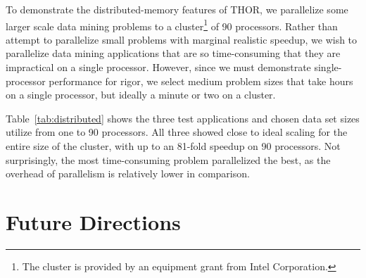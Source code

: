 \documentclass[twoside,leqno,twocolumn]{article}
\newcommand{\fig}[1]{Figure~\ref{fig:#1}}
\newcommand{\tab}[1]{Table~\ref{tab:#1}}
\begin{document}
To demonstrate the distributed-memory features of THOR, we parallelize some larger scale data mining problems to a cluster\footnote{The cluster is provided by an equipment grant from Intel Corporation.} of 90 processors.
Rather than attempt to parallelize small problems with marginal realistic speedup, we wish to parallelize data mining applications that are so time-consuming that they are impractical on a single processor.
However, since we must demonstrate single-processor performance for rigor, we select medium problem sizes that take hours on a single processor, but ideally a minute or two on a cluster.

\tab{distributed} shows the three test applications and chosen data set sizes utilize from one to 90 processors.
All three showed close to ideal scaling for the entire size of the cluster, with up to an 81-fold speedup on 90 processors.
Not surprisingly, the most time-consuming problem parallelized the best, as the overhead of parallelism is relatively lower in comparison.





\section{Future Directions}
\end{document}
